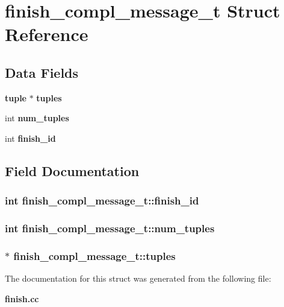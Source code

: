 \section{finish\_\-compl\_\-message\_\-t Struct Reference}
\label{structfinish__compl__message__t}
\subsection*{Data Fields}
\begin{CompactItemize}
\item 
{\bf tuple} $\ast$ {\bf tuples}
\item 
int {\bf num\_\-tuples}
\item 
int {\bf finish\_\-id}
\end{CompactItemize}


\subsection{Field Documentation}
\subsubsection{\setlength{\rightskip}{0pt plus 5cm}int {\bf finish\_\-compl\_\-message\_\-t::finish\_\-id}}\label{structfinish__compl__message__t_o2}


\subsubsection{\setlength{\rightskip}{0pt plus 5cm}int {\bf finish\_\-compl\_\-message\_\-t::num\_\-tuples}}\label{structfinish__compl__message__t_o1}


\subsubsection{$\ast$ {\bf finish\_\-compl\_\-message\_\-t::tuples}}\label{structfinish__compl__message__t_o0}




The documentation for this struct was generated from the following file:\begin{CompactItemize}
\item 
{\bf finish.cc}\end{CompactItemize}
